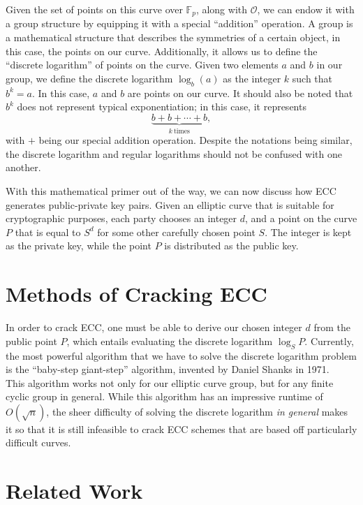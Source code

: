 \documentclass[letterpaper,twocolumn,12pt]{article}
\begin{document}
    Given the set of points on this curve over \( \mathbb{F}_p \), along with
    \( \mathcal{O} \), we can endow it with a group structure by equipping it
    with a special ``addition'' operation.
    A group is a mathematical structure that describes the symmetries of a
    certain object, in this case, the points on our curve.
    Additionally, it allows us to define the ``discrete logarithm'' of points
    on the curve.
    Given two elements \( a \) and \( b \) in our group, we define the discrete
    logarithm \( \log_b(a) \) as the integer \( k \) such that \( b^k = a \).
    In this case, \( a \) and \( b \) are points on our curve. It should also
    be noted that \( b^k \) does not represent typical exponentiation; in this
    case, it represents
    \[ \underbrace{b + b + \cdots + b}_{k\ \textrm{times}}, \]
    with \( + \) being our special addition operation.
    Despite the notations being similar, the discrete logarithm and regular
    logarithms should not be confused with one another.
    
    With this mathematical primer out of the way, we can now discuss how
    ECC generates public-private key pairs. Given an elliptic curve that
    is suitable for cryptographic purposes, each party chooses an integer
    \( d \), and a point on the curve \( P \) that is equal to
    \( S^d \) for some other carefully chosen point \( S \).
    The integer is kept as the private
    key, while the point \( P \) is distributed as the public key.

    \section*{Methods of Cracking ECC}

    In order to crack ECC, one must be able to derive our chosen integer \( d \)
    from the public point \( P \), which entails evaluating the discrete logarithm
    \( \log_SP \).
    Currently, the most powerful algorithm that we have to solve the discrete
    logarithm problem is the ``baby-step giant-step'' algorithm, invented by
    Daniel Shanks in 1971.
    ~\cite{BSGS}
    This algorithm works not only for our elliptic curve group, but for any
    finite cyclic group in general. While this algorithm has an impressive
    runtime of \( O(\sqrt n) \), the sheer difficulty of solving the discrete
    logarithm \textit{in general} makes it so that it is still infeasible to
    crack ECC schemes that are based off particularly difficult curves.

    \section*{Related Work}
\end{document}
